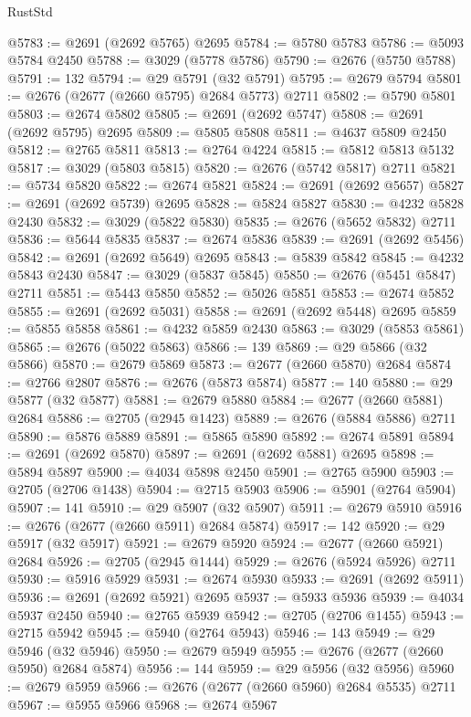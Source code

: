 \begin{lexlean}{RustStd}
\begin{coremodule}
{\begin{coremodule}
{{{{{{{{{{{{{{{{{{{{{{{{{{{{{{{{{{{{{{{{{{{{{{{{{{{{{{{@5783 := @2691 (@2692 @5765) @2695
@5784 := @5780 @5783
@5786 := @5093 @5784 @2450
@5788 := @3029 (@5778 @5786)
@5790 := @2676 (@5750 @5788)
@5791 := 132
@5794 := @29 @5791 (@32 @5791)
@5795 := @2679 @5794
@5801 := @2676 (@2677 (@2660 @5795) @2684 @5773) @2711
@5802 := @5790 @5801
@5803 := @2674 @5802
@5805 := @2691 (@2692 @5747)
@5808 := @2691 (@2692 @5795) @2695
@5809 := @5805 @5808
@5811 := @4637 @5809 @2450
@5812 := @2765 @5811
@5813 := @2764 @4224
@5815 := @5812 @5813 @5132
@5817 := @3029 (@5803 @5815)
@5820 := @2676 (@5742 @5817) @2711
@5821 := @5734 @5820
@5822 := @2674 @5821
@5824 := @2691 (@2692 @5657)
@5827 := @2691 (@2692 @5739) @2695
@5828 := @5824 @5827
@5830 := @4232 @5828 @2430
@5832 := @3029 (@5822 @5830)
@5835 := @2676 (@5652 @5832) @2711
@5836 := @5644 @5835
@5837 := @2674 @5836
@5839 := @2691 (@2692 @5456)
@5842 := @2691 (@2692 @5649) @2695
@5843 := @5839 @5842
@5845 := @4232 @5843 @2430
@5847 := @3029 (@5837 @5845)
@5850 := @2676 (@5451 @5847) @2711
@5851 := @5443 @5850
@5852 := @5026 @5851
@5853 := @2674 @5852
@5855 := @2691 (@2692 @5031)
@5858 := @2691 (@2692 @5448) @2695
@5859 := @5855 @5858
@5861 := @4232 @5859 @2430
@5863 := @3029 (@5853 @5861)
@5865 := @2676 (@5022 @5863)
@5866 := 139
@5869 := @29 @5866 (@32 @5866)
@5870 := @2679 @5869
@5873 := @2677 (@2660 @5870) @2684
@5874 := @2766 @2807
@5876 := @2676 (@5873 @5874)
@5877 := 140
@5880 := @29 @5877 (@32 @5877)
@5881 := @2679 @5880
@5884 := @2677 (@2660 @5881) @2684
@5886 := @2705 (@2945 @1423)
@5889 := @2676 (@5884 @5886) @2711
@5890 := @5876 @5889
@5891 := @5865 @5890
@5892 := @2674 @5891
@5894 := @2691 (@2692 @5870)
@5897 := @2691 (@2692 @5881) @2695
@5898 := @5894 @5897
@5900 := @4034 @5898 @2450
@5901 := @2765 @5900
@5903 := @2705 (@2706 @1438)
@5904 := @2715 @5903
@5906 := @5901 (@2764 @5904)
@5907 := 141
@5910 := @29 @5907 (@32 @5907)
@5911 := @2679 @5910
@5916 := @2676 (@2677 (@2660 @5911) @2684 @5874)
@5917 := 142
@5920 := @29 @5917 (@32 @5917)
@5921 := @2679 @5920
@5924 := @2677 (@2660 @5921) @2684
@5926 := @2705 (@2945 @1444)
@5929 := @2676 (@5924 @5926) @2711
@5930 := @5916 @5929
@5931 := @2674 @5930
@5933 := @2691 (@2692 @5911)
@5936 := @2691 (@2692 @5921) @2695
@5937 := @5933 @5936
@5939 := @4034 @5937 @2450
@5940 := @2765 @5939
@5942 := @2705 (@2706 @1455)
@5943 := @2715 @5942
@5945 := @5940 (@2764 @5943)
@5946 := 143
@5949 := @29 @5946 (@32 @5946)
@5950 := @2679 @5949
@5955 := @2676 (@2677 (@2660 @5950) @2684 @5874)
@5956 := 144
@5959 := @29 @5956 (@32 @5956)
@5960 := @2679 @5959
@5966 := @2676 (@2677 (@2660 @5960) @2684 @5535) @2711
@5967 := @5955 @5966
@5968 := @2674 @5967
}}}}}}}}}}}}}}}}}}}}}}}}}}}}}}}}}}}}}}}}}}}}}}}}}}}}}}}
\end{coremodule}}
\end{coremodule}
\end{lexlean}
